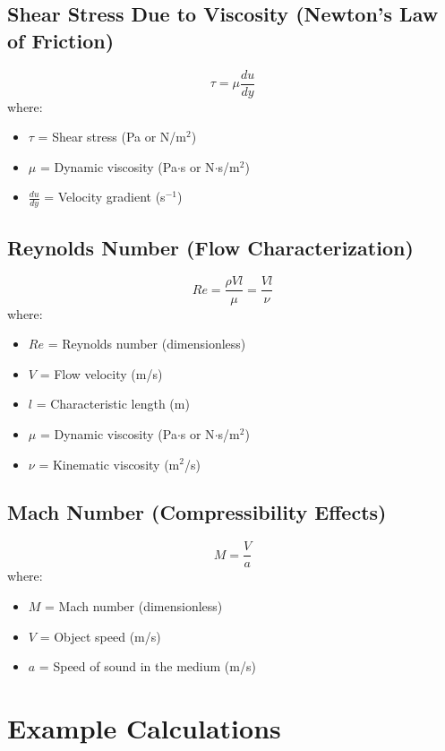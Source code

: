 \documentclass{article}
\begin{document}
\subsection{Shear Stress Due to Viscosity (Newton’s Law of Friction)}
\begin{equation}
    \tau = \mu \frac{du}{dy}
\end{equation}
where:
\begin{itemize}
    \item $\tau$ = Shear stress (Pa or N/m$^2$)
    \item $\mu$ = Dynamic viscosity (Pa$\cdot$s or N$\cdot$s/m$^2$)
    \item $\frac{du}{dy}$ = Velocity gradient (s$^{-1}$)
\end{itemize}

\subsection{Reynolds Number (Flow Characterization)}
\begin{equation}
    Re = \frac{\rho V l}{\mu} = \frac{V l}{\nu}
\end{equation}
where:
\begin{itemize}
    \item $Re$ = Reynolds number (dimensionless)
    \item $V$ = Flow velocity (m/s)
    \item $l$ = Characteristic length (m)
    \item $\mu$ = Dynamic viscosity (Pa$\cdot$s or N$\cdot$s/m$^2$)
    \item $\nu$ = Kinematic viscosity (m$^2$/s)
\end{itemize}

\subsection{Mach Number (Compressibility Effects)}
\begin{equation}
    M = \frac{V}{a}
\end{equation}
where:
\begin{itemize}
    \item $M$ = Mach number (dimensionless)
    \item $V$ = Object speed (m/s)
    \item $a$ = Speed of sound in the medium (m/s)
\end{itemize}

\section{Example Calculations}
\end{document}
